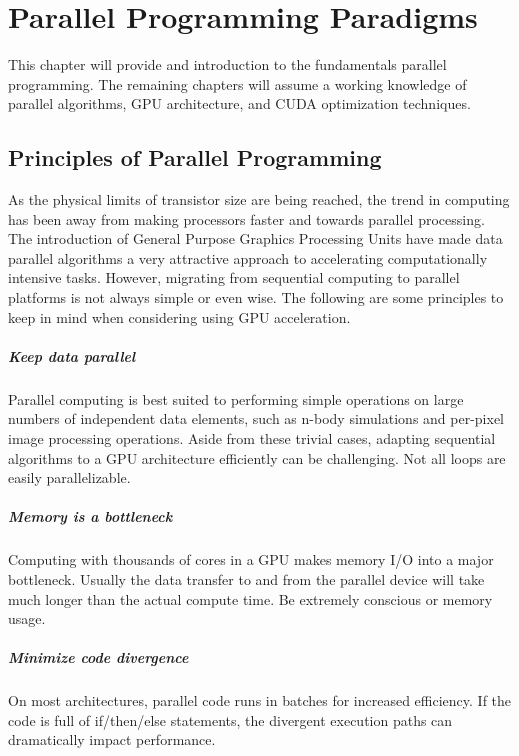 \chapter{Parallel Programming Paradigms}
\label{chap:parallelprogramming}
This chapter will provide and introduction to the fundamentals parallel programming. The remaining chapters will assume a working knowledge of parallel algorithms, GPU architecture, and CUDA optimization techniques.
\section{Principles of Parallel Programming}
As the physical limits of transistor size are being reached, the trend in computing has been away from making processors faster and towards parallel processing. The introduction of General Purpose Graphics Processing Units have made data parallel algorithms a very attractive approach to accelerating computationally intensive tasks. However, migrating from sequential computing to parallel platforms is not always simple or even wise. The following are some principles to keep in mind when considering using GPU acceleration.\par
\paragraph{Keep data parallel} 
Parallel computing is best suited to performing simple operations on large numbers of independent data elements, such as n-body simulations and per-pixel image processing operations. Aside from these trivial cases, adapting sequential algorithms to a GPU architecture efficiently can be challenging. Not all loops are easily parallelizable.
\paragraph{Memory is a bottleneck}
Computing with thousands of cores in a GPU makes memory I/O into a major bottleneck. Usually the data transfer to and from the parallel device will take much longer than the actual compute time. Be extremely conscious or memory usage.
\paragraph{Minimize code divergence}
On most architectures, parallel code runs in batches for increased efficiency. If the code is full of if/then/else statements, the divergent execution paths can dramatically impact performance.
